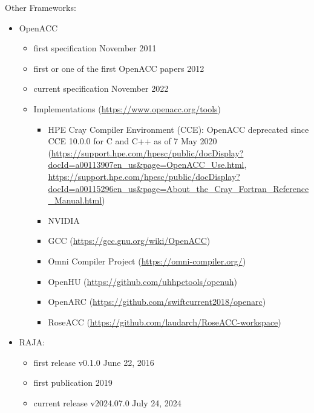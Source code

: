 





\newpage
Other Frameworks:
\begin{itemize}
    \item OpenACC
    \begin{itemize}
        \item first specification November 2011~\cite{openacc_standard_openacc_2011}
        \item first or one of the first OpenACC papers 2012~\cite{hutchison_openacc_2012}
        \item current specification November 2022~\cite{openacc_standard_openacc_2022}
        \item Implementations (\url{https://www.openacc.org/tools})
        \begin{itemize}
            \item HPE Cray Compiler Environment (CCE): OpenACC deprecated since CCE 10.0.0 for C and C++ as of 7 May 2020 (\url{https://support.hpe.com/hpesc/public/docDisplay?docId=a00113907en_us&page=OpenACC_Use.html}, \url{https://support.hpe.com/hpesc/public/docDisplay?docId=a00115296en_us&page=About_the_Cray_Fortran_Reference_Manual.html})
            \item NVIDIA
            \item GCC (\url{https://gcc.gnu.org/wiki/OpenACC})
            \item Omni Compiler Project (\url{https://omni-compiler.org/})
            \item OpenHU (\url{https://github.com/uhhpctools/openuh})
            \item OpenARC (\url{https://github.com/swiftcurrent2018/openarc})
            \item RoseACC (\url{https://github.com/laudarch/RoseACC-workspace})
        \end{itemize}
    \end{itemize}
    
    \item RAJA:
    \begin{itemize}
        \item first release v0.1.0 June 22, 2016~\cite{llnl_release_2016}
        \item first publication 2019~\cite{beckingsale_raja_2019}
        \item current release v2024.07.0 July 24, 2024~\cite{llnl_release_2024}
    \end{itemize}


\end{itemize}
